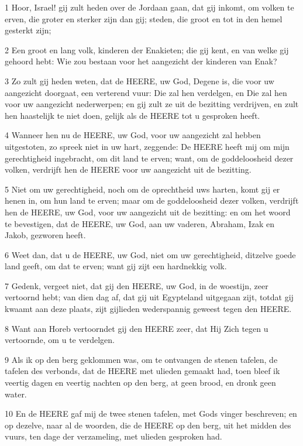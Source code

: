\par 1 Hoor, Israel! gij zult heden over de Jordaan gaan, dat gij inkomt, om volken te erven, die groter en sterker zijn dan gij; steden, die groot en tot in den hemel gesterkt zijn;
\par 2 Een groot en lang volk, kinderen der Enakieten; die gij kent, en van welke gij gehoord hebt: Wie zou bestaan voor het aangezicht der kinderen van Enak?
\par 3 Zo zult gij heden weten, dat de HEERE, uw God, Degene is, die voor uw aangezicht doorgaat, een verterend vuur: Die zal hen verdelgen, en Die zal hen voor uw aangezicht nederwerpen; en gij zult ze uit de bezitting verdrijven, en zult hen haastelijk te niet doen, gelijk als de HEERE tot u gesproken heeft.
\par 4 Wanneer hen nu de HEERE, uw God, voor uw aangezicht zal hebben uitgestoten, zo spreek niet in uw hart, zeggende: De HEERE heeft mij om mijn gerechtigheid ingebracht, om dit land te erven; want, om de goddeloosheid dezer volken, verdrijft hen de HEERE voor uw aangezicht uit de bezitting.
\par 5 Niet om uw gerechtigheid, noch om de oprechtheid uws harten, komt gij er henen in, om hun land te erven; maar om de goddeloosheid dezer volken, verdrijft hen de HEERE, uw God, voor uw aangezicht uit de bezitting: en om het woord te bevestigen, dat de HEERE, uw God, aan uw vaderen, Abraham, Izak en Jakob, gezworen heeft.
\par 6 Weet dan, dat u de HEERE, uw God, niet om uw gerechtigheid, ditzelve goede land geeft, om dat te erven; want gij zijt een hardnekkig volk.
\par 7 Gedenk, vergeet niet, dat gij den HEERE, uw God, in de woestijn, zeer vertoornd hebt; van dien dag af, dat gij uit Egypteland uitgegaan zijt, totdat gij kwaamt aan deze plaats, zijt gijlieden wederspannig geweest tegen den HEERE.
\par 8 Want aan Horeb vertoorndet gij den HEERE zeer, dat Hij Zich tegen u vertoornde, om u te verdelgen.
\par 9 Als ik op den berg geklommen was, om te ontvangen de stenen tafelen, de tafelen des verbonds, dat de HEERE met ulieden gemaakt had, toen bleef ik veertig dagen en veertig nachten op den berg, at geen brood, en dronk geen water.
\par 10 En de HEERE gaf mij de twee stenen tafelen, met Gods vinger beschreven; en op dezelve, naar al de woorden, die de HEERE op den berg, uit het midden des vuurs, ten dage der verzameling, met ulieden gesproken had.
